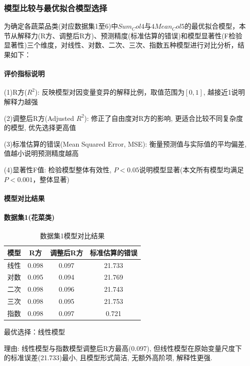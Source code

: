\documentclass{cumcmthesis}
\begin{document}
\subsubsection{模型比较与最优拟合模型选择}

为确定各蔬菜品类(对应数据集1至6)中$Sum_Col4$与$4Mean_Col5$的最优拟合模型，本节从解释力(R方、调整后R方)、预测精度(标准估算的错误)和模型显著性(F检验显著性)三个维度，对线性、对数、二次、三次、指数五种模型进行对比分析，结果如下：

\paragraph{评价指标说明}

(1)R方($R^2$): 反映模型对因变量变异的解释比例，取值范围为$[0,1]$, 越接近1说明解释力越强

(2)调整后R方(Adjusted $R^2$): 修正了自由度对R方的影响, 更适合比较不同复杂度的模型, 优先选择更高值

(3)标准估算的错误(Mean Squared Error, MSE): 衡量预测值与实际值的平均偏差, 值越小说明预测精度越高

(4)显著性F值: 检验模型整体有效性, $P<0.05$说明模型显著(本文所有模型均满足$P<0.001$，整体显著)

\paragraph{模型对比结果}

\paragraph{数据集1(花菜类)}
\begin{table}[H]
\centering
\begin{tabular}{cccc}
\hline
模型 & R方 & 调整后R方 & 标准估算的错误 \\
\hline
线性 & 0.098 & 0.097 & 21.733 \\
对数 & 0.095 & 0.094 & 21.769 \\
二次 & 0.098 & 0.096 & 21.743 \\
三次 & 0.098 & 0.095 & 21.753 \\
指数 & 0.098 & 0.097 & 0.721 \\
\hline
\end{tabular}
\caption{数据集1模型对比结果}
\label{tab:dataset1}
\end{table}

最优选择：线性模型

理由: 线性模型与指数模型调整后R方最高(0.097), 但线性模型在原始变量尺度下的标准误差(21.733)最小, 且模型形式简洁, 无额外高阶项, 解释性更强. 
\end{document}
